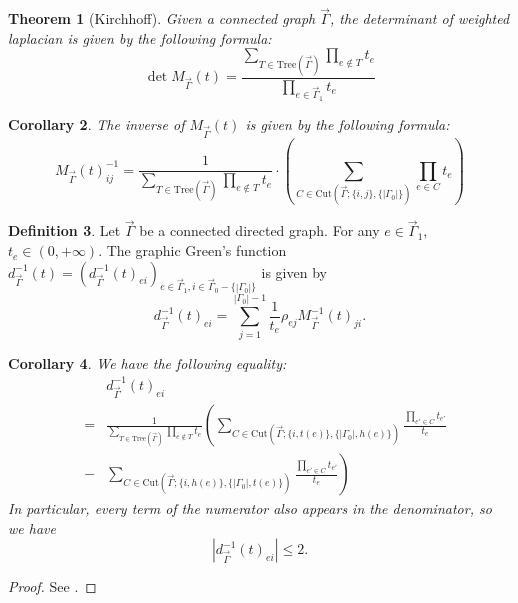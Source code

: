 \documentclass[11pt]{amsart}
\newtheorem{thm}{Theorem}[section]
\newtheorem{cor}[thm]{Corollary}
\theoremstyle{definition}
\newtheorem{defn}[thm]{Definition}
\theoremstyle{remark}
\numberwithin{equation}{section}
\begin{document}
\begin{thm}[Kirchhoff]
  Given a connected graph $\vec{\Gamma}$, the determinant of
  weighted laplacian is given by the following formula:
  \[ \det M_{\vec{\Gamma}} (t) = \frac{\underset{T \in \mathrm{Tree} (\vec{\Gamma})}{\sum}
     \underset{e \notin T}{\prod} t_e}{\underset{e \in \vec{\Gamma}_1}{\prod} t_e} \]
\end{thm}

\begin{cor}\label{det of laplacian}
  The inverse of $M_{\vec{\Gamma}} (t)$ is given by the following
  formula:\label{Minverse}
  \[ M_{\vec{\Gamma}} (t)^{- 1}_{i j} = \frac{1}{\underset{T \in \mathrm{Tree}
     (\vec{\Gamma})}{\sum} \underset{e \notin T}{\prod} t_e} \cdot \left( \sum_{C \in
     \mathrm{Cut} (\vec{\Gamma} ; \{ i, j \}, \{ | \Gamma_0 | \})} \prod_{e \in C} t_e
     \right) \]
\end{cor}
\begin{defn}
    Let $\vec{\Gamma}$ be a connected directed graph. For any $e\in\vec{\Gamma}_{1}$, $t_e\in(0,+\infty)$. The graphic Green's function $d^{-1}_{\vec{\Gamma}}(t)=(d^{-1}_{\vec{\Gamma}}(t)_{ei})_{e\in\vec{\Gamma}_{1},i\in\vec{\Gamma}_{0}-\{| \Gamma_0 |\}}$ is given by
    $$
    d^{-1}_{\vec{\Gamma}}(t)_{ei}=\sum_{j=1}^{| \Gamma_0 |-1}\frac{1}{t_{e}}\rho_{ej}M^{-1}_{\vec{\Gamma}}(t)_{ji}.
    $$
\end{defn}

\begin{cor}
  \label{boundness}We have the following equality:
  \begin{eqnarray*}
    &  & d^{-1}_{\vec{\Gamma}}(t)_{ei}\\
    & = & \frac{1}{\underset{T \in \mathrm{Tree} (\vec{\Gamma})}{\sum} \underset{e
    \notin T}{\prod} t_e} \left( \sum_{C \in \mathrm{Cut} (\vec{\Gamma} ; \{ i, t (e)
    \}, \{ | \Gamma_0 |, h (e) \})} \frac{\prod_{e' \in C} t_{e'}}{t_e}
    \right.\\
    & - & \left. \sum_{C \in \mathrm{Cut} (\vec{\Gamma} ; \{ i, h (e) \}, \{ |
    \Gamma_0 |, t (e) \})} \frac{\prod_{e' \in C} t_{e'}}{t_e} \right)
  \end{eqnarray*}
  In particular, every term of the numerator also appears in the denominator,
  so we have
  \[ \left| d^{-1}_{\vec{\Gamma}}(t)_{ei} \right| \leqslant 2. \]
\end{cor}

\begin{proof}
  See {\cite[Appendix B]{Li:2011mi}}.
\end{proof}
\end{document}
